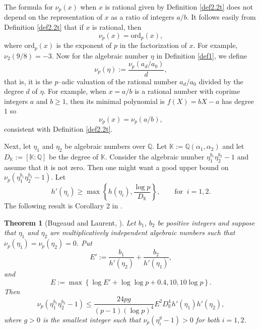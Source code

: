 \documentclass[11pt,a4paper]{article}
\newtheorem{theorem}{Theorem}[section]
\numberwithin{equation}{section}
\numberwithin{table}{section}
\numberwithin{figure}{section}
\begin{document}
The formula for $\nu_p(x)$ when $x$ is rational given by Definition \ref{def2.2t} does not depend on the representation of $x$ as a ratio of integers $a/b$. It follows easily from Definition \ref{def2.2t} that if $x$ is rational, then
$$
\nu_p(x)=\text{ord}_p(x),
$$
where $\text{ord}_p(x)$ is the exponent of $p$ in the factorization of $x$. For example, $\nu_2(9/8)=-3$. Now for the algebraic number $\eta$ in Definition \ref{def1}, we define
\[
\nu_p(\eta):=\frac{\nu_p(a_d/a_0)}{d},
\]
that is, it is the $p$--adic valuation of the rational number $a_d/a_0$ divided by the degree $d$ of $\eta$. For example, when $x=a/b$ is a rational number with coprime integers $a$ and $b\ge 1$, then 
its minimal polynomial is $f(X)=bX-a$ has degree $1$ so 
$$
\nu_p(x)=\nu_p(a/b),
$$
consistent with Definition \ref{def2.2t}. 


Next, let $\eta_{1}$ and $\eta_{2}$ be algebraic numbers over $\mathbb{Q}$. Let ${\mathbb K}:={\mathbb Q}(\alpha_1,\alpha_2)$ and let $D_{\mathbb K}:=[{\mathbb K}:{\mathbb Q}]$ be the degree 
of ${\mathbb K}$. Consider the algebraic number $\eta_1^{b_1}\eta_2^{b_2}-1$ and assume that it is not zero. Then one might want a good upper bound on 
$\nu_p(\eta_1^{b_1}\eta_2^{b_2}-1)$. Let 
\[h'(\eta_{i}) \ge \max \left\{h(\eta_{i}),\dfrac{\log p}{D_{\mathbb K}}\right\}, \qquad\text{for }~i=1,2.\]
The following result is Corollary 2 in \cite{BL}. 
\begin{theorem}[Bugeaud and Laurent, \cite{BL}]\label{thm:Bugt}
	Let $b_1$, $b_2$ be positive integers and suppose that $\eta_{1}$ and $\eta_{2}$ are multiplicatively independent algebraic numbers such that $\nu_p(\eta_{1})=\nu_p(\eta_{2})=0$. Put 
	$$  E':=\dfrac{b_1}{h'(\eta_{2})}+\dfrac{b_2}{h'(\eta_{1})},   $$
	and 
	$$ E:=\max\left\{\log E'+\log\log p+0.4, 10, 10\log p\right\}.    $$
	Then
	$$ \nu_p\left(\eta_{1}^{b_1}\eta_{2}^{b_2}-1\right)\le \frac{24pg}{(p-1)(\log p)^4} E^2D_{\mathbb K}^4   h'(\eta_{1})h'(\eta_{2}  ), $$
	where $g>0$ is the smallest integer such that $\nu_p\left(\eta_{i}^g-1\right)>0$ for both $i=1,2$.
\end{theorem}
\end{document}
